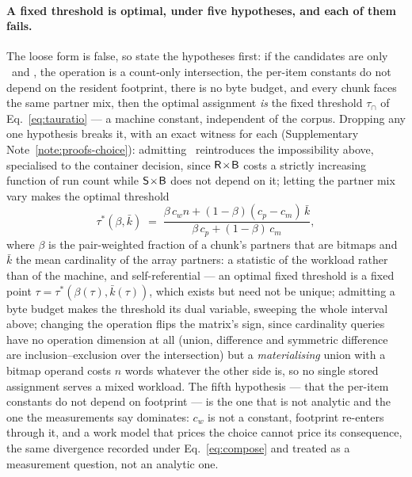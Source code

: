 \paragraph*{A fixed threshold is optimal, under five hypotheses, and each of them fails.}
The loose form is false, so state the hypotheses first: if the candidates are
only \rS\ and \rB, the operation is a count-only intersection, the per-item constants do not depend on
the resident footprint, there is no byte budget, and every chunk faces the same partner mix, then the
optimal assignment \emph{is} the fixed threshold $\tau_{\cap}$ of Eq.~\eqref{eq:tauratio} --- a machine
constant, independent of the corpus. Dropping any one hypothesis breaks it, with an exact witness for
each (Supplementary Note~\ref{note:proofs-choice}): admitting \rR\ reintroduces the impossibility above, specialised to the
container decision, since $\textsf{R}\!\times\!\textsf{B}$ costs a strictly increasing function of run count while
$\textsf{S}\!\times\!\textsf{B}$ does not depend on it; letting the partner mix vary makes the optimal threshold
\begin{equation}
\tau^{*}(\beta,\bar k)\;=\;\frac{\beta\,c_w n+(1-\beta)(c_p-c_m)\,\bar k}
                                 {\beta\,c_p+(1-\beta)\,c_m},
\label{eq:taustar}
\end{equation}
where $\beta$ is the pair-weighted fraction of a chunk's partners that are bitmaps and $\bar k$ the
mean cardinality of the array partners: a statistic of the workload rather than of the machine, and
self-referential --- an optimal fixed
threshold is a fixed point $\tau=\tau^{*}(\beta(\tau),\bar k(\tau))$, which exists but need not be
unique; admitting a byte budget makes the threshold its dual variable, sweeping the whole interval
above; changing the operation flips the matrix's sign, since cardinality queries have no operation
dimension at all (union, difference and symmetric difference are inclusion--exclusion over the
intersection) but a \emph{materialising} union with a bitmap operand costs $n$ words whatever the other
side is, so no single stored assignment serves a mixed workload. The fifth hypothesis --- that the
per-item constants do not depend on footprint --- is the one that is not analytic and the one the
measurements say dominates: $c_w$ is not a constant, footprint re-enters through it, and a work model
that prices the choice cannot price its consequence, the same divergence recorded under
Eq.~\eqref{eq:compose} and treated as a measurement question, not an analytic one.

